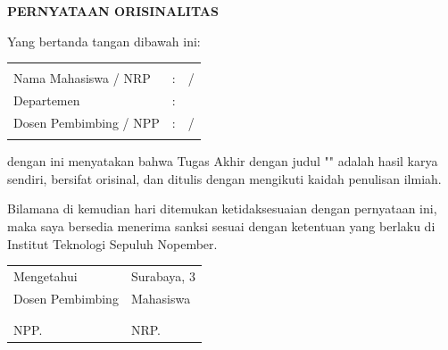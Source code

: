 \begin{center}
  \large
  \textbf{PERNYATAAN ORISINALITAS}
\end{center}

\thispagestyle{empty}

\vspace{2ex}


\noindent Yang bertanda tangan dibawah ini:

\noindent\begin{tabularx}{\textwidth}{l l X}
                         &   &                            \\
  Nama Mahasiswa / NRP   & : & \name{} / \nrp{}           \\
  Departemen             & : & \department{}              \\
  Dosen Pembimbing / NPP & : & \advisor{} / \advisornip{} \\
                         &   &                            \\
\end{tabularx}

\noindent
dengan ini menyatakan bahwa Tugas Akhir dengan judul "\tatitle{}" adalah hasil karya sendiri, bersifat orisinal, dan ditulis dengan mengikuti kaidah penulisan ilmiah.

\noindent
Bilamana di kemudian hari ditemukan ketidaksesuaian dengan pernyataan ini, maka saya bersedia menerima sanksi sesuai dengan ketentuan yang berlaku di Institut Teknologi Sepuluh Nopember.

\vspace{5ex}

\noindent
\begin{tabularx}{\textwidth}{ >{\centering\arraybackslash}X >{\centering\arraybackslash}X }

	Mengetahui & Surabaya, 3 \MONTH{} \the\year{} \\
	Dosen Pembimbing & Mahasiswa \\

	\\[2.5cm]

	\textbf{\advisor{}} & \textbf{\name{}} \\
	NPP. \advisornip{} & NRP. \nrp{} \\


%
%

\end{tabularx}